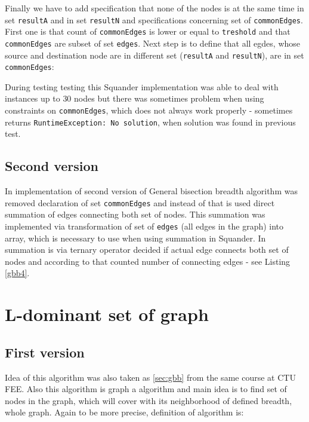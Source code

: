 \documentclass[11pt,twoside,a4paper]{book}
\begin{document}


Finally we have to add specification that none of the nodes is at the same time
in set \verb|resultA| and in set \verb|resultN| and specifications concerning
set of \verb|commonEdges|. First one is that count of \verb|commonEdges| is
lower or equal to \verb|treshold| and that \verb|commonEdges| are subset of set
\verb|edges|. Next step is to define that all egdes, whose source and
destination node are in different set (\verb|resultA| and \verb|resultN|), are
in set \verb|commonEdges|:



During testing testing this Squander implementation was able to deal with
instances up to $30$ nodes but there was sometimes problem when using
constraints on \verb|commonEdges|, which does not always work properly -
sometimes returns \verb|RuntimeException: No solution|, when solution was found
in previous test.

\subsection{Second version}
In implementation of second version of General bisection breadth algorithm was
removed declaration of  set \verb|commonEdges| and instead of that
is used direct summation of edges connecting both set of nodes. This summation
was implemented via transformation of set of \verb|edges| (all edges in the
graph) into array, which is necessary to use when using summation in Squander.
In summation is via ternary operator decided if actual edge connects both set of
nodes and according to that counted number of connecting edges - see Listing
\ref{gbb4}.



\newpage
\section{L-dominant set of graph}
\label{sec:ldsg}

\subsection{First version}
\label{sub:ldsFrstVer}
Idea of this algorithm was also taken as \ref{sec:gbb} from the same course at
CTU FEE. Also this algorithm is graph a algorithm and main idea is to find set
of nodes in the graph, which will cover with its neighborhood of defined
breadth, whole graph. Again to be more precise, definition of algorithm is:
\end{document}
